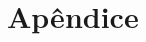 \documentclass[
	article,			%
	12pt,				%
	oneside,			%
	a4paper,			%
	english,			%
	brazil				%
	]{abntex2}
\begin{document}
\cleardoublepage
\postextual



\cleardoublepage

\appendix

\chapter{Apêndice}

\label{LastPage}
\end{document}
